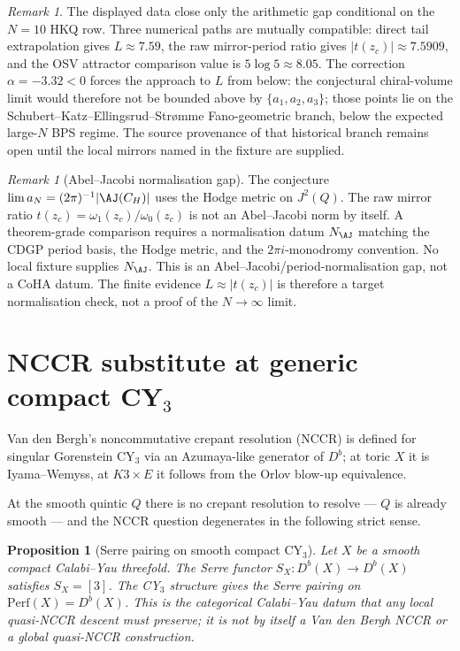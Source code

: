 \documentclass[12pt]{amsart}
\newtheorem{prop}[thm]{Proposition}
\theoremstyle{remark}
\newtheorem{rmk}[thm]{Remark}
\providecommand{\Perf}{\mathrm{Perf}}
\begin{document}
\begin{rmk}
  The displayed data close only the arithmetic gap conditional on the
  \(N=10\) HKQ row. Three numerical paths are mutually compatible:
  direct tail extrapolation gives \(L\approx7.59\), the raw mirror-period
  ratio gives $|t(z_c)| \approx 7.5909$, and the OSV attractor comparison
  value is $5 \log 5 \approx 8.05$. The correction
  $\alpha = -3.32 < 0$ forces the approach to $L$ from below: the
  conjectural chiral-volume limit would therefore not be bounded above by
  $\{a_1, a_2, a_3\}$; those points lie on the
  Schubert--Katz--Ellingsrud--Str\o mme Fano-geometric branch, below
  the expected large-$N$ BPS regime. The source provenance of that
  historical branch remains open until the local mirrors named in the
  fixture are supplied.
\end{rmk}

\begin{rmk}[Abel--Jacobi normalisation gap]
  \label{rmk:hodge-normalisation-aj}
  The conjecture
  $\lim a_N = (2\pi)^{-1} |\AJ(C_H)|$ uses the Hodge metric on
  $J^2(Q)$. The raw mirror ratio
  \(t(z_c)=\omega_1(z_c)/\omega_0(z_c)\) is not an Abel--Jacobi norm by
  itself. A theorem-grade comparison requires a normalisation datum
  \(N_{\AJ}\) matching the CDGP period basis, the Hodge metric, and the
  \(2\pi i\)-monodromy convention. No local fixture supplies
  \(N_{\AJ}\). This is an Abel--Jacobi/period-normalisation gap, not a
  CoHA datum. The finite evidence \(L\approx |t(z_c)|\) is therefore a
  target normalisation check, not a proof of the \(N\to\infty\) limit.
\end{rmk}

\section{NCCR substitute at generic compact CY$_3$}

Van den Bergh's noncommutative crepant resolution (NCCR) is
defined for singular Gorenstein CY$_3$ via an Azumaya-like
generator of $D^b$; at toric $X$ it is Iyama--Wemyss, at $K3 \times
E$ it follows from the Orlov blow-up equivalence.

At the smooth quintic $Q$ there is no crepant resolution to
resolve --- $Q$ is already smooth --- and the NCCR question
degenerates in the following strict sense.

\begin{prop}[Serre pairing on smooth compact CY$_3$]
  \label{prop:serre-nccr-substitute}
  Let $X$ be a smooth compact Calabi--Yau threefold. The Serre
  functor $S_X : D^b(X) \to D^b(X)$ satisfies \(S_X=[3]\).  The CY$_3$
  structure gives the Serre pairing on \(\Perf(X)=D^b(X)\).  This is the
  categorical Calabi--Yau datum that any local quasi-NCCR descent must
  preserve; it is not by itself a Van den Bergh NCCR or a global
  quasi-NCCR construction.
\end{prop}
\end{document}

